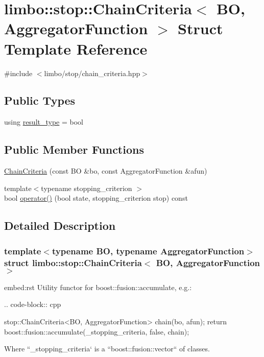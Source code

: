 \hypertarget{structlimbo_1_1stop_1_1_chain_criteria}{}\section{limbo\+:\+:stop\+:\+:Chain\+Criteria$<$ B\+O, Aggregator\+Function $>$ Struct Template Reference}
\label{structlimbo_1_1stop_1_1_chain_criteria}


{\ttfamily \#include $<$limbo/stop/chain\+\_\+criteria.\+hpp$>$}

\subsection*{Public Types}
\begin{DoxyCompactItemize}
\item 
using \hyperlink{structlimbo_1_1stop_1_1_chain_criteria_a3e9b4e7191e4568a44bba75647bf0fb5}{result\+\_\+type} = bool
\end{DoxyCompactItemize}
\subsection*{Public Member Functions}
\begin{DoxyCompactItemize}
\item 
\hyperlink{structlimbo_1_1stop_1_1_chain_criteria_a287a286866f5ddc83432f23dc1c7c63d}{Chain\+Criteria} (const B\+O \&bo, const Aggregator\+Function \&afun)
\item 
{\footnotesize template$<$typename stopping\+\_\+criterion $>$ }\\bool \hyperlink{structlimbo_1_1stop_1_1_chain_criteria_a1d95f89ebcc61121482a372d37c3a62f}{operator()} (bool state, stopping\+\_\+criterion stop) const 
\end{DoxyCompactItemize}


\subsection{Detailed Description}
\subsubsection*{template$<$typename B\+O, typename Aggregator\+Function$>$struct limbo\+::stop\+::\+Chain\+Criteria$<$ B\+O, Aggregator\+Function $>$}

\begin{DoxyVerb}embed:rst
Utility functor for boost::fusion::accumulate, e.g.:

.. code-block:: cpp

  stop::ChainCriteria<BO, AggregatorFunction> chain(bo, afun);
  return boost::fusion::accumulate(_stopping_criteria, false, chain);

Where ``_stopping_criteria` is a ``boost::fusion::vector`` of classes.\end{DoxyVerb}
 


